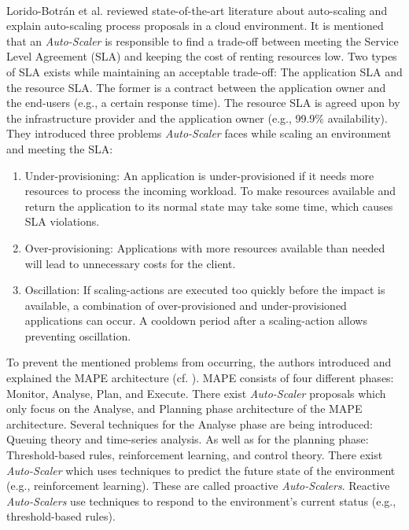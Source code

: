 \paragraph{}
Lorido-Botrán et al. \cite{Lorido2014Review} reviewed state-of-the-art literature about auto-scaling and explain auto-scaling process proposals in a cloud environment.
It is mentioned that an \textit{Auto-Scaler} is responsible to find a trade-off between meeting the Service Level Agreement (SLA) and keeping the cost of renting resources low.
Two types of SLA exists while maintaining an acceptable trade-off: The application SLA and the resource SLA. The former is a contract between the application owner and the end-users (e.g., a certain response time). The resource SLA is agreed upon by the infrastructure provider and the application owner (e.g., 99.9\% availability).
They introduced three problems \textit{Auto-Scaler} faces while scaling an environment and meeting the SLA:
\begin{enumerate}
\item Under-provisioning:
An application is under-provisioned if it needs more resources to process the incoming workload.
To make resources available and return the application to its normal state may take some time, which causes SLA violations.
\item Over-provisioning:
Applications with more resources available than needed will lead to unnecessary costs for the client.
\item Oscillation:
If scaling-actions are executed too quickly before the impact is available, a combination of over-provisioned and under-provisioned applications can occur.
A cooldown period after a scaling-action allows preventing oscillation.
\end{enumerate}
To prevent the mentioned problems from occurring, the authors introduced and explained the MAPE architecture (cf. ).
MAPE consists of four different phases: Monitor, Analyse, Plan, and Execute.
There exist \textit{Auto-Scaler} proposals which only focus on the Analyse, and Planning phase architecture of the MAPE architecture.
Several techniques for the Analyse phase are being introduced: Queuing theory and time-series analysis.
As well as for the planning phase: Threshold-based rules, reinforcement learning, and control theory.
There exist \textit{Auto-Scaler} which uses techniques to predict the future state of the environment (e.g., reinforcement learning). These are called proactive \textit{Auto-Scalers}.
Reactive \textit{Auto-Scalers} use techniques to respond to the environment's current status (e.g., threshold-based rules).


